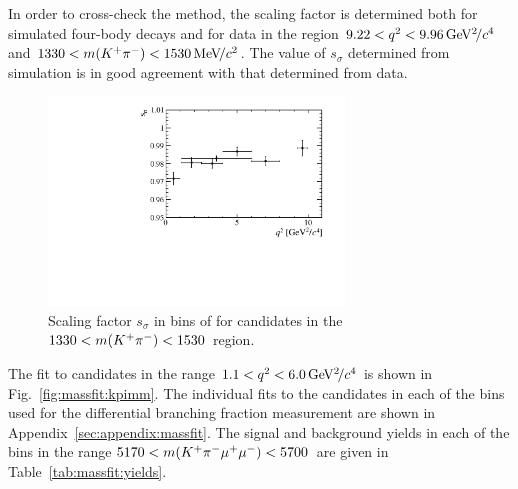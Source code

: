 In order to cross-check the method, the scaling factor is determined both for simulated four-body \BdToKpimm decays and for data in the region $9.22<{q^2}<9.96{\mathrm{\,Ge\kern -0.1em V^2\!/}c^4}$ and $1330<m({{K}^+}{{\pi}^-})<1530{\mathrm{\,Me\kern -0.1em V\!/}c^2}$.  The value of $s_{\sigma}$ determined from simulation is in good agreement with that determined from data.

\begin{figure}[!tb]
 \centering
 \includegraphics[width=0.7\textwidth]{figs/kpimm/massfit/s_sigma.pdf}
 \caption{Scaling factor $s_{\sigma}$ in bins of \qsq for candidates in the $1330<m({{K}^+}{{\pi}^-})<1530$~\mevcc region.
 \label{fig:massfit:scale}}
\end{figure}


 The fit to \BdToKpimm candidates in the range $1.1 < {q^2} < 6.0{\mathrm{\,Ge\kern -0.1em V^2\!/}c^4}$ is shown in Fig.~\ref{fig:massfit:kpimm}.  The individual fits to the \BdToKpimm candidates in each of the \qsq bins used for the differential branching fraction measurement are shown in Appendix~\ref{sec:appendix:massfit}. The signal and background yields in each of the \qsq bins in the range $5170<m({{K}^+}{{\pi}^-}{\mu^+}{\mu^-})<5700$~\mevcc are given in Table~\ref{tab:massfit:yields}.

